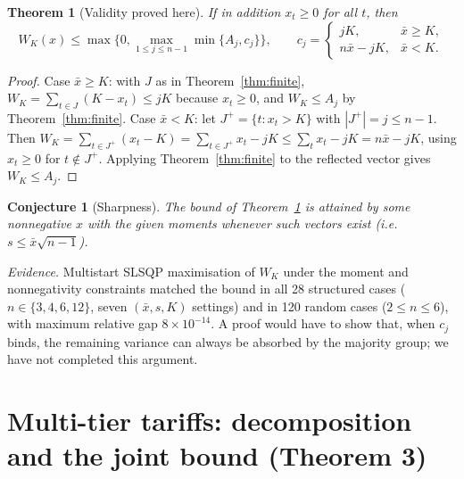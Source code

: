 \documentclass[11pt,a4paper]{article}
\newtheorem{theorem}{Theorem}
\newtheorem{conjecture}{Conjecture}
\theoremstyle{definition}
\theoremstyle{plain}\newtheorem{sprop}{Proposition}[section]\newtheorem{slemma}[sprop]{Lemma}\newtheorem{scor}[sprop]{Corollary}
\theoremstyle{definition}
\theoremstyle{remark}
\newcommand{\xbar}{\bar{x}}
\numberwithin{equation}{section}
\begin{document}
\begin{theorem}[Validity proved here]\label{thm:nonneg}
If in addition $x_t\ge0$ for all $t$, then
\[
W_K(x)\le\max\Big\{0,\max_{1\le j\le n-1}\min\{A_j,c_j\}\Big\},\qquad c_j=\begin{cases}jK,&\xbar\ge K,\\ n\xbar-jK,&\xbar<K.\end{cases}
\]
\end{theorem}
\begin{proof}
Case $\xbar\ge K$: with $J$ as in Theorem~\ref{thm:finite}, $W_K=\sum_{t\in J}(K-x_t)\le jK$ because $x_t\ge0$, and $W_K\le A_j$ by Theorem~\ref{thm:finite}. Case $\xbar<K$: let $J^+=\{t:x_t>K\}$ with $|J^+|=j\le n-1$. Then $W_K=\sum_{t\in J^+}(x_t-K)=\sum_{t\in J^+}x_t-jK\le\sum_tx_t-jK=n\xbar-jK$, using $x_t\ge0$ for $t\notin J^+$. Applying Theorem~\ref{thm:finite} to the reflected vector gives $W_K\le A_j$.
\end{proof}

\begin{conjecture}[Sharpness]\label{conj}
The bound of Theorem~\ref{thm:nonneg} is attained by some nonnegative $x$ with the given moments whenever such vectors exist (i.e.\ $s\le\xbar\sqrt{n-1}$).
\end{conjecture}
\noindent\emph{Evidence.} Multistart SLSQP maximisation of $W_K$ under the moment and nonnegativity constraints matched the bound in all 28 structured cases ($n\in\{3,4,6,12\}$, seven $(\xbar,s,K)$ settings) and in 120 random cases ($2\le n\le6$), with maximum relative gap $8\times10^{-14}$. A proof would have to show that, when $c_{j}$ binds, the remaining variance can always be absorbed by the majority group; we have not completed this argument.

\section{Multi-tier tariffs: decomposition and the joint bound (Theorem 3)}\label{sec:S8}
\end{document}
